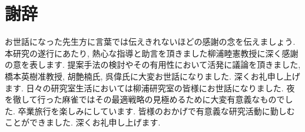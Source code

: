 \chapter*{謝辞}
お世話になった先生方に言葉では伝えきれないほどの感謝の念を伝えましょう.
本研究の遂行にあたり, 熱心な指導と助言を頂きました柳浦睦憲教授に深く感謝の意を表します.
提案手法の検討やその有用性において活発に議論を頂きました, 橋本英樹准教授, 胡艶楠氏, 呉偉氏に大変お世話になりました. 深くお礼申し上げます.
日々の研究室生活においては柳浦研究室の皆様にお世話になりました.
夜を徹して行った麻雀ではその最適戦略の見極めるために大変有意義なものでした.
卒業旅行を楽しみにしています.
皆様のおかげで有意義な研究活動に勤しむことができました. 深くお礼申し上げます.
